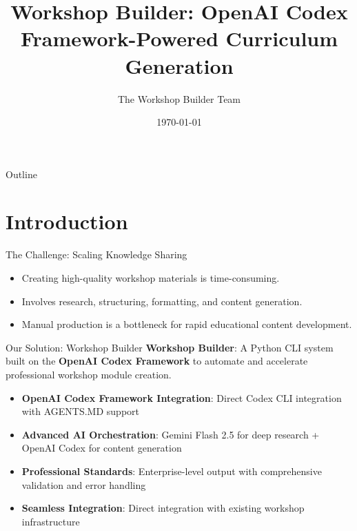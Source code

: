 \documentclass{beamer}
\title[Workshop Builder]{Workshop Builder: OpenAI Codex Framework-Powered Curriculum Generation}
\author{The Workshop Builder Team}
\institute{Advanced AI Agent Orchestration System}
\date{\today}
\begin{document}
\begin{frame}
    \titlepage
\end{frame}

\begin{frame}{Outline}
    \tableofcontents
\end{frame}

\section{Introduction} \label{L_section_introduction}

\begin{frame}{The Challenge: Scaling Knowledge Sharing}
    \begin{itemize}
        \item Creating high-quality workshop materials is time-consuming.
        \item Involves research, structuring, formatting, and content generation.
        \item Manual production is a bottleneck for rapid educational content development.
    \end{itemize}
\end{frame}

\begin{frame}{Our Solution: Workshop Builder}
    \textbf{Workshop Builder}: A Python CLI system built on the \textbf{OpenAI Codex Framework} to automate and accelerate professional workshop module creation.
    \begin{itemize}
        \item \textbf{OpenAI Codex Framework Integration}: Direct Codex CLI integration with AGENTS.MD support
        \item \textbf{Advanced AI Orchestration}: Gemini Flash 2.5 for deep research + OpenAI Codex for content generation
        \item \textbf{Professional Standards}: Enterprise-level output with comprehensive validation and error handling
        \item \textbf{Seamless Integration}: Direct integration with existing workshop infrastructure
    \end{itemize}
\end{frame}
\end{document}
